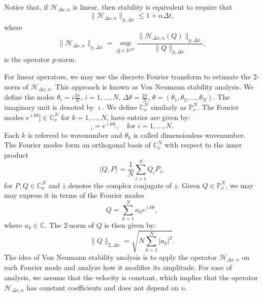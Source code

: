 Notice that, if $\mathcal{H}_{\Delta x,n}$ is linear, then stability is equivalent to require that
\begin{equation*}
	\|\mathcal{H}_{\Delta x,n}\|_{p,\Delta x} \leq 1+ \alpha \Delta t,
\end{equation*}
where
\begin{equation*}
	\|\mathcal{H}_{\Delta x,n}\|_{p,\Delta x} = \sup_{Q\in \mathbb{R}^{\Delta x}} \frac{\|\mathcal{H}_{\Delta x,n}(Q)\|_{p,\Delta x}}{\|Q\|_{p,\Delta x}},
\end{equation*}
is the operator $p$-norm.

For linear operators, we may use the discrete Fourier transform \citep{trefethen:2000}
to estimate the 2-norm of $\mathcal{H}_{\Delta x,n}$. This approach is known as Von Neumann stability analysis.
We define the nodes $\theta_i = i\frac{2\pi}{N}$, $i=1, \ldots, N$, $\Delta \theta = \frac{2\pi}{N}$,
$\theta = (\theta_1, \theta_2, \ldots, \theta_N)$.
The imaginary unit is denoted by $\imath$.
We define $\mathbb{C}^{N}_{\nu}$  similarly as $\mathbb{P}^{N}_{\nu}$.
The Fourier modes $e^{\imath k \theta}] \in \mathbb{C}^{N}_{\nu}$ for $k=1, \ldots, N$, have entries are given by:
\begin{equation*}
	[e^{\imath k \theta}]_i = e^{\imath k\theta_i},\quad \text{for } i=1, \ldots, N.
\end{equation*}
Each $k$ is referred to wavenumber and $\theta_k$ is called  dimensionless wavenumber.
The Fourier modes form an orthogonal basis of $\mathbb{C}^N_{\nu}$ with respect to the 
inner product
\begin{equation*}
	\langle Q, P \rangle = \frac{1}{N}\sum_{i=1}^{N}{Q_i \overline{P_i}},
\end{equation*}
for $P, Q \in \mathbb{C}^{N}_{\nu}$ and $\overline{z}$ denotes the complex conjugate of $z$. 
Given $Q \in \mathbb{P}^{N}_{\nu}$, we may may express it in terms of the Fourier modes
\begin{equation*}
	Q = \sum_{k=1}^{N} a_k e^{\imath k \theta},
\end{equation*}
where $a_k \in \mathbb{C}$. The 2-norm of $Q$ is then given by:
\begin{equation*}
	\|Q\|_{2,\Delta x} = \sqrt{N \sum_{k=1}^{N} |a_k|^2}.
\end{equation*}
The idea of Von Neumann stability analysis is to apply the operator $\mathcal{H}_{\Delta x,n}$ on each Fourier mode and
analyze how it modifies its amplitude.
For ease of analysis, we assume that the velocity is constant, which implies that
the operator $\mathcal{H}_{\Delta x,n}$ has constant coefficients and does not depend on $n$.
